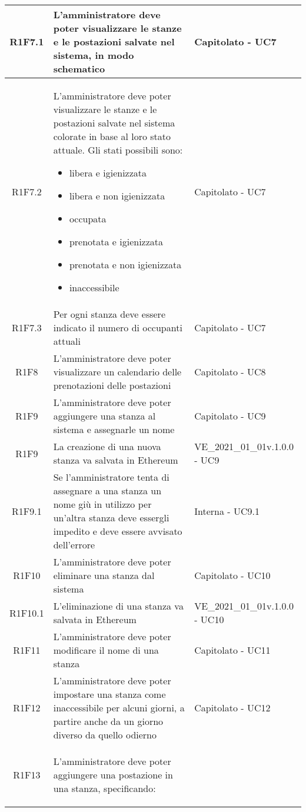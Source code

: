 \begin{center}
\begin{longtable}{|c|p{10cm}|p{4cm}|}
		\hline
		R1F7.1&L'amministratore deve poter visualizzare le stanze e le postazioni salvate nel sistema, in modo schematico& Capitolato - UC7	\\
		\hline
		R1F7.2&L'amministratore deve poter visualizzare le stanze e le postazioni salvate nel sistema colorate in base al loro stato attuale. Gli stati possibili sono:
		\begin{itemize}
			\item libera e igienizzata
			\item libera e non igienizzata
			\item occupata
			\item prenotata e igienizzata
			\item prenotata e non igienizzata
			\item inaccessibile
		\end{itemize}& Capitolato - UC7	\\
		\hline
		R1F7.3&Per ogni stanza deve essere indicato il numero di occupanti attuali	& Capitolato - UC7	\\
		\hline
		R1F8&L'amministratore deve poter visualizzare un calendario delle prenotazioni delle postazioni	& Capitolato - UC8	\\
		\hline
		R1F9&L'amministratore deve poter aggiungere una stanza al sistema e assegnarle un nome	& Capitolato - UC9	\\
		\hline
		R1F9&	La creazione di una nuova stanza va salvata in Ethereum&VE\_2021\_01\_01v.1.0.0 - UC9 	\\
		\hline
		R1F9.1 & Se l'amministratore tenta di assegnare a una stanza un nome giù in utilizzo per un'altra stanza deve essergli impedito e deve essere avvisato dell'errore & Interna - UC9.1 \\
		R1F10&L'amministratore deve poter eliminare una stanza dal sistema	& Capitolato - UC10	\\
		\hline
		R1F10.1&L'eliminazione di una stanza va salvata in Ethereum	& VE\_2021\_01\_01v.1.0.0 - UC10	\\
		\hline
		R1F11&L'amministratore deve poter modificare il nome di una stanza	& Capitolato - UC11	\\
		\hline
		R1F12&L'amministratore deve poter impostare una stanza come inaccessibile per alcuni giorni, a partire anche da un giorno diverso da quello odierno	& Capitolato - UC12	\\
		\hline
		R1F13&L'amministratore deve poter aggiungere una postazione in una stanza, specificando:
		\begin{itemize}

\end{itemize}
\end{longtable}
\end{center}
